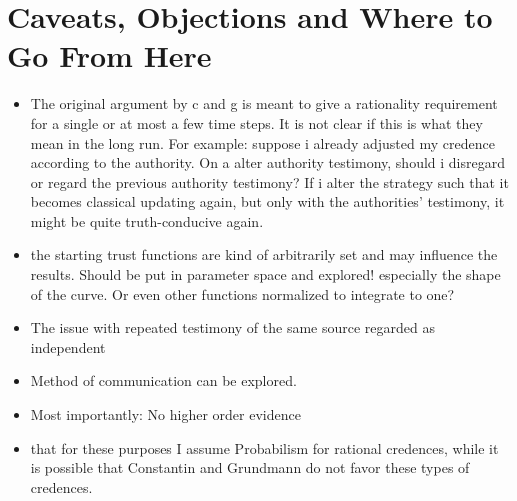 \documentclass[11pt, a4paper]{scrartcl}
\begin{document}
\section{Caveats, Objections and Where to Go From Here}

\begin{itemize}

    \item The original argument by c and g is meant to give a rationality requirement for a single or at most a few time steps. It is not clear if this is what they mean in the long run. For example: suppose i already adjusted my credence according to the authority. On a alter authority testimony, should i disregard or regard the previous authority testimony? If i alter the strategy such that it becomes classical updating again, but only with the authorities' testimony, it might be quite truth-conducive again.

    \item the starting trust functions are kind of arbitrarily set and may influence the results. Should be put in parameter space and explored! especially the shape of the curve. Or even other functions normalized to integrate to one?
    \item The issue with repeated testimony of the same source regarded as independent
    \item Method of communication can be explored.
    \item Most importantly: No higher order evidence
    \item that for these purposes I assume Probabilism for rational credences, while it is possible that Constantin and Grundmann do not favor these types of credences.
\end{itemize}

\printbibliography{}
\end{document}
